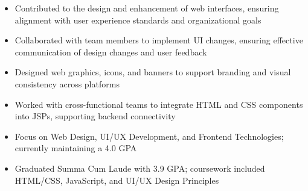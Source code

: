 \par\smallskip
\noindent
\begin{minipage}{20cm}
  \begin{minipage}{9.75cm}
    \begin{itemize}
      \item Contributed to the design and enhancement of web interfaces, ensuring alignment with user experience standards and organizational goals
      \item Collaborated with team members to implement UI changes, ensuring effective communication of design changes and user feedback
    \end{itemize}
  \end{minipage}
  \hfill
  \begin{minipage}{9.75cm}
    \begin{itemize}
      \item Designed web graphics, icons, and banners to support branding and visual consistency across platforms
      \item Worked with cross-functional teams to integrate HTML and CSS components into JSPs, supporting backend connectivity
    \end{itemize}
  \end{minipage}
\end{minipage}

\begin{itemize}
  \item Focus on Web Design, UI/UX Development, and Frontend Technologies; currently maintaining a 4.0 GPA
\end{itemize}
\divider

\begin{itemize}
  \item Graduated Summa Cum Laude with 3.9 GPA; coursework included HTML/CSS, JavaScript, and UI/UX Design Principles
\end{itemize}

\noindent
\begin{minipage}{20cm}
       
     
    
\end{minipage}


